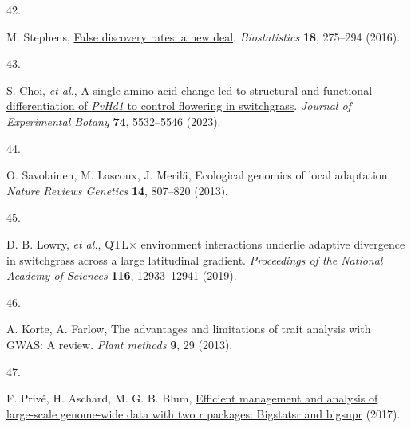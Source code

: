 \documentclass[
  9pt,
  twocolumn,
  twoside]{pnas-new}
\newlength{\cslhangindent}
\newlength{\csllabelwidth}
\newenvironment{CSLReferences}[2] %
 {\begin{list}{}{%
  \setlength{\itemindent}{0pt}
  \setlength{\leftmargin}{0pt}
  \setlength{\parsep}{0pt}
  \ifodd #1
   \setlength{\leftmargin}{\cslhangindent}
   \setlength{\itemindent}{-1\cslhangindent}
  \fi
  \setlength{\itemsep}{#2\baselineskip}}}
 {\end{list}}
\newcommand{\CSLLeftMargin}[1]{\parbox[t]{\csllabelwidth}{\strut#1\strut}}
\newcommand{\CSLRightInline}[1]{\parbox[t]{\linewidth - \csllabelwidth}{\strut#1\strut}}
\begin{document}
\begin{CSLReferences}{0}{1}
\CSLLeftMargin{42. }%
\CSLRightInline{M. Stephens,
\href{https://doi.org/10.1093/biostatistics/kxw041}{{False discovery
rates: a new deal}}. \emph{Biostatistics} \textbf{18}, 275--294 (2016).}

\CSLLeftMargin{43. }%
\CSLRightInline{S. Choi, \emph{et al.},
\href{https://doi.org/10.1093/jxb/erad255}{A single amino acid change
led to structural and functional differentiation of {\emph{PvHd1}} to
control flowering in switchgrass}. \emph{Journal of Experimental Botany}
\textbf{74}, 5532--5546 (2023).}

\CSLLeftMargin{44. }%
\CSLRightInline{O. Savolainen, M. Lascoux, J. Merilä, Ecological
genomics of local adaptation. \emph{Nature Reviews Genetics}
\textbf{14}, 807--820 (2013).}

\CSLLeftMargin{45. }%
\CSLRightInline{D. B. Lowry, \emph{et al.}, QTL\(\times\) environment
interactions underlie adaptive divergence in switchgrass across a large
latitudinal gradient. \emph{Proceedings of the National Academy of
Sciences} \textbf{116}, 12933--12941 (2019).}

\CSLLeftMargin{46. }%
\CSLRightInline{A. Korte, A. Farlow, The advantages and limitations of
trait analysis with GWAS: A review. \emph{Plant methods} \textbf{9}, 29
(2013).}

\CSLLeftMargin{47. }%
\CSLRightInline{F. Privé, H. Aschard, M. G. B. Blum,
\href{http://dx.doi.org/10.1101/190926}{Efficient management and
analysis of large-scale genome-wide data with two r packages: Bigstatsr
and bigsnpr} (2017).}

\end{CSLReferences}


\showacknow{} %
\end{document}
